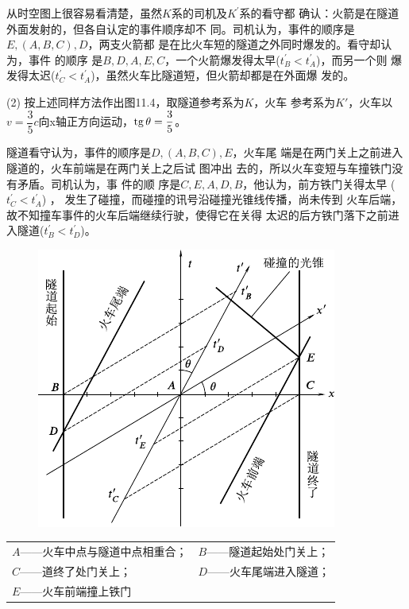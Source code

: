 从时空图上很容易看清楚，虽然$ K $系的司机及$ K ^ { \prime } $系的看守都
确认：火箭是在隧道外面发射的，但各自认定的事件顺序却不
同。司机认为，事件的顺序是$ E, (A, B, C), D $，两支火箭都
是在比火车短的隧道之外同时爆发的。看守却认为，事件
的顺序
是$ B, D, A, E, C $，一个火箭爆发得太早($ t _ { B } ^ { \prime } < t _ { A } ^ { \prime } $)，而另一个则
爆发得太迟($ t _ { C } ^ { \prime } < t _ { A } ^ { \prime } $)，虽然火车比隧道短，但火箭却都是在外面爆
发的。

(2) 按上述同样方法作出图11.4，取隧道参考系为$ K $，火车
参考系为$ K' $，火车以$ v = \dfrac { 3 } { 5 } c $向x轴正方向运动，$ \operatorname{tg} \theta = \dfrac { 3 } { 5 } $。

隧道看守认为，事件的顺序是$ D, (A, B, C), E $，火车尾
端是在两门关上之前进入隧道的，火车前端是在两门关上之后试
图冲出
去的，所以火车变短与车撞铁门没有矛盾。司机认为，事
件的顺\clearpage\noindent
序是$ C, E, A, D, B $，他认为，前方铁门关得太早
($ t _ { C } ^ { \prime } < t _ { A } ^ { \prime } $) ，
发生了碰撞，而碰撞的讯号沿碰撞光锥线传播，尚未传到
火车后端，故不知撞车事件的火车后端继续行驶，使得它在关得
太迟的后方铁门落下之前进入隧道($ t _ { B } ^ { \prime } < t _ { D } ^ { \prime } $)。

\begin{figure}[h]
  \centering
  \includegraphics{figure/fig11.04}
  \caption{}
  \label{fig:11.04}
\end{figure}

\begin{center}
  \begin{tabular}{ll}
    $ A $——火车中点与隧道中点相重合； & $ B $——隧道起始处门关上； \\
    $ C $——道终了处门关上；      & $ D $——火车尾端进入隧道； \\
    $ E $——火车前端撞上铁门      &                  \\
  \end{tabular}
\end{center}

